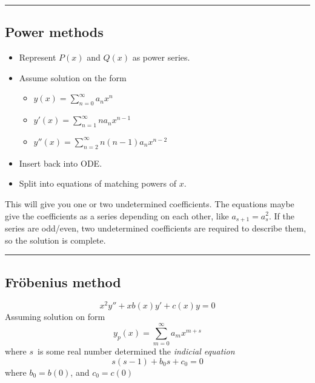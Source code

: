 \documentclass[10pt,a4paper]{article}
\newcommand{\holine}{\rule{286pt}{1pt}}
\begin{document}
\begin{multicols}{2}
\holine
\subsection*{Power methods}
\begin{itemize}
    \item Represent $P(x)$ and $Q(x)$ as power series.
    \item Assume solution on the form
    \begin{itemize}
        \item $y(x) = \sum_{n=0}^\infty a_n x^n$
        \item $y'(x) = \sum_{n=1}^\infty n a_n x^{n-1}$
        \item $y''(x) = \sum_{n=2}^\infty n(n-1) a_n x^{n-2}$ 
    \end{itemize}
    \item Insert back into ODE.
    \item Split into equations of matching powers of $x$.
\end{itemize}
This will give you one or two undetermined coefficients. The equations maybe give the coefficients as a series depending on each other, like $a_{s+1} = a_s^2$. If the series are odd/even, two undetermined coefficients are required to describe them, so the solution is complete.



\holine
\subsection*{Fröbenius method}
\[
    x^2 y'' + xb(x)y' + c(x) y = 0
\]
Assuming solution on form
\[
    y_p(x) = \sum_{m=0}^\infty a_m x^{m+s}
\]
where $s$ is some real number determined  the \textit{indicial equation}
\[
    s(s-1) + b_0s + c_0 = 0
\]
where $b_0=b(0)$, and $c_0=c(0)$


\end{multicols}
\end{document}
